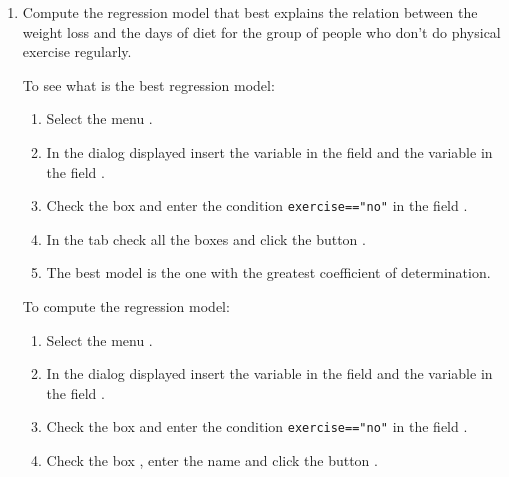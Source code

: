 \begin{enumerate}[leftmargin=*]
\begin{enumerate}
\item Compute the regression model that best explains the relation between the weight loss and the days of diet for the
group of people who don't do physical exercise regularly.
\begin{indication}
To see what is the best regression model:
\begin{enumerate}
\item Select the menu .
\item In the dialog displayed insert the variable  in the field  and the
variable  in the field .
\item Check the box  and enter the condition \lstinline{exercise=="no"} in the field .
\item In the  tab check all the boxes and click the button .
\item The best model is the one with the greatest coefficient of determination.
\end{enumerate}
To compute the regression model:
\begin{enumerate}
\item Select the menu .
\item In the dialog displayed insert the variable  in the field  and the
variable  in the field .
\item Check the box  and enter the condition \lstinline{exercise=="no"} in the field
.
\item Check the box , enter the name  and click
the button .
\end{enumerate}
\end{indication}


\end{enumerate}
\end{enumerate}
